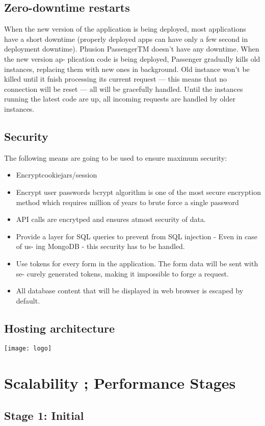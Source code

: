 \documentclass[12pt]{article}
\begin{document}
\subsection{Zero-downtime restarts}
When the new version of the application is being deployed, most applications have a short downtime (properly deployed apps can have only a few second in deployment downtime). Phusion PassengerTM doesn’t have any downtime. When the new version ap- plication code is being deployed, Passenger gradually kills old instances, replacing them with new ones in background. Old instance won’t be killed until it fnish processing its current request — this means that no connection will be reset — all will be gracefully handled. Until the instances running the latest code are up, all incoming requests are handled by older instances.
\subsection{Security}
The following means are going to be used to ensure maximum security:
\begin{itemize} 
\item Encryptcookiejars/session
\item Encrypt user passwords bcrypt algorithm is one of the most secure encryption method which requires million of years to brute force a single password
\item API calls are encrytped and ensures atmost security of data.
\item Provide a layer for SQL queries to prevent from SQL injection - Even in case of us- ing MongoDB - this security has to be handled.
\item Use tokens for every form in the application. The form data will be sent with se- curely generated tokens, making it impossible to forge a request.
\item All database content that will be displayed in web browser is escaped by default.
\end{itemize}

\subsection{Hosting architecture}
\texttt{[image: logo]}
\section{Scalability \amp; Performance Stages}
\subsection{Stage 1: Initial}
\end{document}
